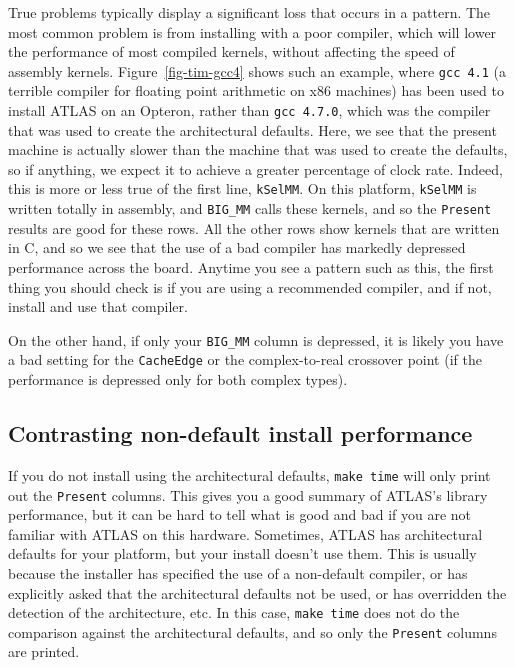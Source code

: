 \documentclass[11pt]{article}
\begin{document}
True problems typically display a significant loss that occurs in a pattern.
The most common problem is from installing with a poor compiler, which will
lower the performance of most compiled kernels, without affecting the speed
of assembly kernels.  Figure~\ref{fig-tim-gcc4} shows 
such an example, where {\tt gcc 4.1} (a terrible
compiler for floating point arithmetic on x86 machines) has been used to
install ATLAS on an Opteron, rather than {\tt gcc 4.7.0}, which was the compiler
that was used to create the architectural defaults.
Here, we see that the present machine is actually slower than the machine
that was used to create the defaults, so if anything, we expect it to
achieve a greater percentage of clock rate.  Indeed, this is more or less
true of the first line, {\tt kSelMM}.  On this platform, {\tt kSelMM} is
written totally in assembly, and {\tt BIG\_MM} calls these kernels,
and so the {\tt Present} results are good for these rows.  All the other
rows show kernels that are written in C, and so we see that the use of
a bad compiler has markedly depressed performance across the board.  
Anytime you see a pattern such as this, the first thing you should check
is if you are using a recommended compiler, and if not, install and use
that compiler.

On the other hand, if only your {\tt BIG\_MM} column is depressed, it is
likely you have a bad setting for the {\tt CacheEdge} or the complex-to-real
crossover point (if the performance is depressed only for both complex types).

\subsection{Contrasting non-default install performance}
\label{sec-time-nondefault}
If you do not install using the architectural defaults, {\tt make time} will
only print out the {\tt Present} columns.  This gives you a good summary of
ATLAS's library performance, but it can be hard to tell what is good and
bad if you are not familiar with ATLAS on this hardware.  Sometimes, ATLAS
has architectural defaults for your platform, but your install doesn't use
them.  This is usually because the installer has specified the use of a
non-default compiler, or has explicitly asked that the architectural defaults
not be used, or has overridden the detection of the architecture, etc.  In
this case, {\tt make time} does not do the comparison
against the architectural defaults, and so only the {\tt Present} columns
are printed.
\end{document}
